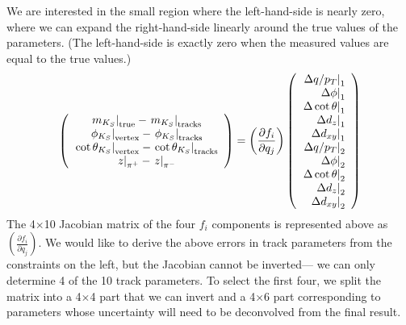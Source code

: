\documentclass[12pt]{article}
\begin{document}
We are interested in the small region where the left-hand-side is
nearly zero, where we can expand the right-hand-side linearly around
the true values of the parameters.  (The left-hand-side is exactly
zero when the measured values are equal to the true values.)
\begin{equation}
\left(\begin{array}{c}
\left.m_{K_S}\right|_{\mbox{\scriptsize true}} - \left.m_{K_S}\right|_{\mbox{\scriptsize tracks}} \\
\left.\phi_{K_S}\right|_{\mbox{\scriptsize vertex}} - \left.\phi_{K_S}\right|_{\mbox{\scriptsize tracks}} \\
\left.\cot\theta_{K_S}\right|_{\mbox{\scriptsize vertex}} - \left.\cot\theta_{K_S}\right|_{\mbox{\scriptsize tracks}} \\
\left.z\right|_{\pi^+} - \left.z\right|_{\pi^-} \\
\end{array}\right) =
\left(\frac{\partial f_i}{\partial q_j}\right)
\left(\begin{array}{r}
\left.\Delta q/p_T\right|_1 \\
\left.\Delta \phi\right|_1 \\
\left.\Delta \cot\theta\right|_1 \\
\left.\Delta d_z\right|_1 \\
\left.\Delta d_{xy}\right|_1 \\
\left.\Delta q/p_T\right|_2 \\
\left.\Delta \phi\right|_2 \\
\left.\Delta \cot\theta\right|_2 \\
\left.\Delta d_z\right|_2 \\
\left.\Delta d_{xy}\right|_2 \\
\end{array}\right)
\label{eqn:tangent_space}
\end{equation}
The 4$\times$10 Jacobian matrix of the four $f_i$ components is
represented above as $\left(\frac{\partial f_i}{\partial q_j}\right)$.
We would like to derive the above errors in track parameters from the
constraints on the left, but the Jacobian cannot be inverted--- we can
only determine 4 of the 10 track parameters.  To select the first
four, we split the matrix into a 4$\times$4 part that we can invert
and a 4$\times$6 part corresponding to parameters whose uncertainty
will need to be deconvolved from the final result.
\end{document}
